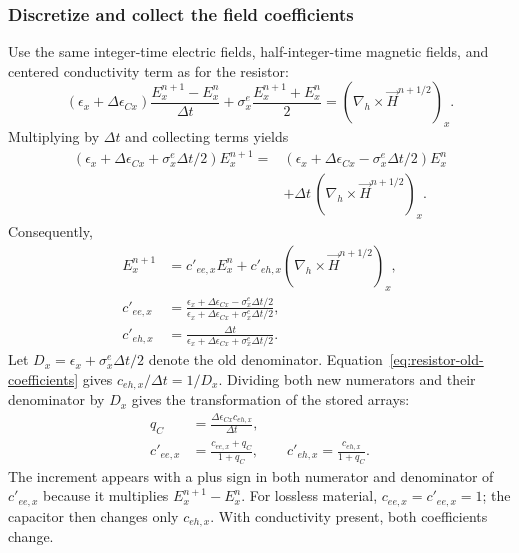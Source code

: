\documentclass[10pt]{article}
\begin{document}
\subsubsection{Discretize and collect the field coefficients}
Use the same integer-time electric fields, half-integer-time magnetic
fields, and centered conductivity term as for the resistor:
\begin{equation}
    (\epsilon_x+\Delta\epsilon_{Cx})
        \frac{E_x^{n+1}-E_x^n}{\Delta t}
    +\sigma_x^e\frac{E_x^{n+1}+E_x^n}{2}
        =(\nabla_h\times\vec H^{n+1/2})_x.
\end{equation}
Multiplying by $\Delta t$ and collecting terms yields
\begin{equation}
    \begin{aligned}
    (\epsilon_x+\Delta\epsilon_{Cx}+\sigma_x^e\Delta t/2)E_x^{n+1}
       ={}&(\epsilon_x+\Delta\epsilon_{Cx}-\sigma_x^e\Delta t/2)E_x^n\\
          &+\Delta t\,(\nabla_h\times\vec H^{n+1/2})_x.
    \end{aligned}
\end{equation}
Consequently,
\begin{equation}
    \boxed{\begin{aligned}
    E_x^{n+1}&=c'_{ee,x}E_x^n
        +c'_{eh,x}(\nabla_h\times\vec H^{n+1/2})_x,\\
    c'_{ee,x}&=\frac{\epsilon_x+\Delta\epsilon_{Cx}-\sigma_x^e\Delta t/2}
                         {\epsilon_x+\Delta\epsilon_{Cx}+\sigma_x^e\Delta t/2},\\
    c'_{eh,x}&=\frac{\Delta t}
                         {\epsilon_x+\Delta\epsilon_{Cx}+\sigma_x^e\Delta t/2}.
    \end{aligned}}
    \label{eq:capacitor-field}
\end{equation}
Let $D_x=\epsilon_x+\sigma_x^e\Delta t/2$ denote the old denominator.
Equation~\eqref{eq:resistor-old-coefficients} gives
$c_{eh,x}/\Delta t=1/D_x$. Dividing both new numerators and their
denominator by $D_x$ gives the transformation of the stored arrays:
\begin{equation}
    \boxed{\begin{aligned}
    q_C&=\frac{\Delta\epsilon_{Cx}c_{eh,x}}{\Delta t},\\
    c'_{ee,x}&=\frac{c_{ee,x}+q_C}{1+q_C},\qquad
    c'_{eh,x}=\frac{c_{eh,x}}{1+q_C}.
    \end{aligned}}
    \label{eq:capacitor-coefficients}
\end{equation}
The increment appears with a plus sign in both numerator and denominator
of $c'_{ee,x}$ because it multiplies $E_x^{n+1}-E_x^n$.
For lossless material, $c_{ee,x}=c'_{ee,x}=1$; the capacitor then changes
only $c_{eh,x}$. With conductivity present, both coefficients change.
\end{document}
